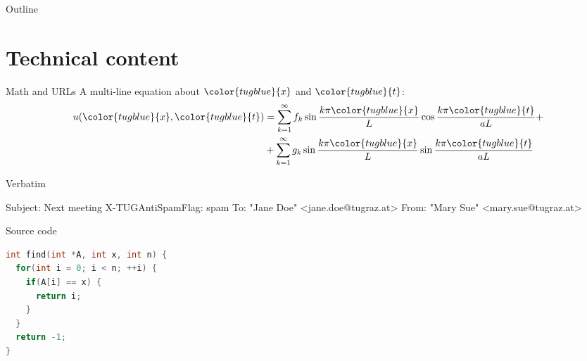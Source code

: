 \documentclass[table,aspectratio=43]{beamer}
\begin{document}
\begin{frame}{Outline}
  \tableofcontents[currentsection] 
\end{frame}




\section{Technical content}

\newcommand{\blue}[1]{{\color{tugblue}{#1}}}
\begin{frame}{Math and URLs}
  A multi-line equation about $\blue{x}$ and $\blue{t}$:
	\begin{align*}
    u(\blue{x},\blue{t}) &= \sum_{k=1}^{\infty} f_k \sin \frac{k \pi \blue{x}}{L} \cos \frac{k \pi \blue{t}}{aL} + \\
                         & + \sum_{k=1}^{\infty} g_k \sin \frac{k \pi \blue{x}}{L} \sin \frac{k \pi \blue{t}}{aL}
	\end{align*}
\end{frame}

\begin{frame}[fragile]{Verbatim}
	\begin{semiverbatim}
Subject: Next meeting
\alert{X-TUGAntiSpamFlag: spam}
To: "Jane Doe" <jane.doe@tugraz.at>
From: "Mary Sue" <mary.sue@tugraz.at>
	\end{semiverbatim}
\end{frame}

\begin{frame}[fragile]{Source code}
  \begin{lstlisting}[language=C,basicstyle=\ttfamily]
int find(int *A, int x, int n) {
  for(int i = 0; i < n; ++i) {
    if(A[i] == x) {
      return i;
    }
  }
  return -1;
}
  \end{lstlisting}
\end{frame}
\end{document}

